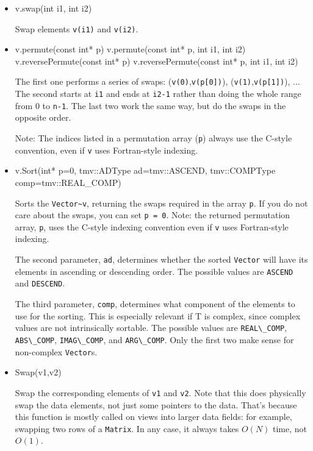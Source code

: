 \documentclass[twoside,letterpaper,11pt]{article}
\renewcommand{\tt}[1]{{\lstinline {#1}}}
\begin{document}
\begin{itemize}
\item
\begin{tmvcode}
v.swap(int i1, int i2)
\end{tmvcode}
Swap elements \tt{v(i1)} and \tt{v(i2)}.

\item
\begin{tmvcode}
v.permute(const int* p)
v.permute(const int* p, int i1, int i2)
v.reversePermute(const int* p)
v.reversePermute(const int* p, int i1, int i2)
\end{tmvcode}
The first one performs a series of swaps: (\tt{v(0)},\tt{v(p[0])}), (\tt{v(1)},\tt{v(p[1])}), ... 
The second starts at \tt{i1} and ends at \tt{i2-1} rather than
doing the whole range from 0 to \tt{n-1}.
The last two work the same way, but do the swaps in the opposite order.

Note: The indices listed in a permutation array (\tt{p}) always use 
the C-style convention, even if \tt{v} uses Fortran-style indexing.

\item
\begin{tmvcode}
v.Sort(int* p=0, tmv::ADType ad=tmv::ASCEND, 
      tmv::COMPType comp=tmv::REAL_COMP)
\end{tmvcode}
Sorts the \tt{Vector~v}, returning the swaps required in the array \tt{p}.
If you do not care about the swaps, you can set \tt{p = 0}.
Note: the returned permutation array, \tt{p}, uses the C-style indexing convention
even if \tt{v} uses Fortran-style indexing.

The second parameter, \tt{ad}, determines whether the sorted \tt{Vector} 
will have its elements in ascending or descending order.  The possible values
are \tt{ASCEND} and \tt{DESCEND}. 

The third parameter, \tt{comp}, determines what component of the
elements to use for the sorting.  This is especially relevant if T is complex, 
since complex values are not intrinsically sortable.
The possible values are
\tt{REAL\_COMP}, \tt{ABS\_COMP},
\tt{IMAG\_COMP}, and \tt{ARG\_COMP}.
Only the first two make sense for non-complex \tt{Vector}s.  

\item
\begin{tmvcode}
Swap(v1,v2)
\end{tmvcode}
Swap the corresponding elements of \tt{v1} and \tt{v2}.  Note that this does physically
swap the data elements, not just some pointers to the data.  That's because this function
is mostly called on views into larger data fields: for example, swapping two rows of a 
\tt{Matrix}.  In any case, it always takes $O(N)$ time, not $O(1)$.

\end{itemize}
\end{document}
